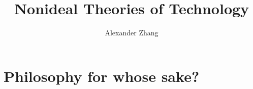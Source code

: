 \documentclass[letterpaper,notitlepage,12pt]{article}
\title{Nonideal Theories of Technology}
\author{Alexander Zhang}
\date{}
\begin{document}
\maketitle

\section{Philosophy for whose sake?}




\end{document}
